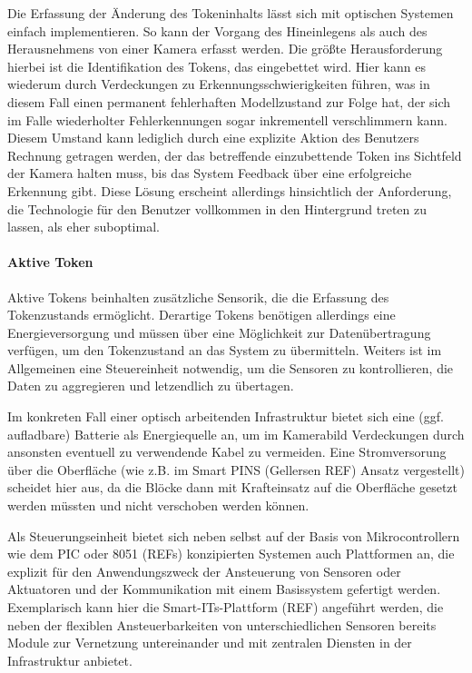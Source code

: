 Die Erfassung der Änderung des Tokeninhalts lässt sich mit optischen Systemen einfach implementieren. So kann der Vorgang des Hineinlegens als auch des Herausnehmens von einer Kamera erfasst werden. Die größte Herausforderung hierbei ist die Identifikation des Tokens, das eingebettet wird. Hier kann es wiederum durch Verdeckungen zu Erkennungsschwierigkeiten führen, was in diesem Fall einen permanent fehlerhaften Modellzustand zur Folge hat, der sich im Falle wiederholter Fehlerkennungen sogar inkrementell verschlimmern kann. Diesem Umstand kann lediglich durch eine explizite Aktion des Benutzers Rechnung getragen werden, der das betreffende einzubettende Token ins Sichtfeld der Kamera halten muss, bis das System Feedback über eine erfolgreiche Erkennung gibt. Diese Lösung erscheint allerdings hinsichtlich der Anforderung, die Technologie für den Benutzer vollkommen in den Hintergrund treten zu lassen, als eher suboptimal.


\paragraph{Aktive Token} %
\label{par:aktive_token}

Aktive Tokens beinhalten zusätzliche Sensorik, die die Erfassung des Tokenzustands ermöglicht. Derartige Tokens benötigen allerdings eine Energieversorgung und müssen über eine Möglichkeit zur Datenübertragung verfügen, um den Tokenzustand an das System zu übermitteln. Weiters ist im Allgemeinen eine Steuereinheit notwendig, um die Sensoren zu kontrollieren, die Daten zu aggregieren und letzendlich zu übertagen.

Im konkreten Fall einer optisch arbeitenden Infrastruktur bietet sich eine (ggf. aufladbare) Batterie als Energiequelle an, um im Kamerabild Verdeckungen durch ansonsten eventuell zu verwendende Kabel zu vermeiden. Eine Stromversorung über die Oberfläche (wie z.B. im Smart PINS (Gellersen REF) Ansatz vergestellt) scheidet hier aus, da die Blöcke dann mit Krafteinsatz auf die Oberfläche gesetzt werden müssten und nicht verschoben werden können. 

Als Steuerungseinheit bietet sich neben selbst auf der Basis von Mikrocontrollern wie dem PIC oder 8051 (REFs) konzipierten Systemen auch Plattformen an, die explizit für den Anwendungszweck der Ansteuerung von Sensoren oder Aktuatoren und der Kommunikation mit einem Basissystem gefertigt werden. Exemplarisch kann hier die Smart-ITs-Plattform (REF) angeführt werden, die neben der flexiblen Ansteuerbarkeiten von unterschiedlichen Sensoren bereits Module zur Vernetzung untereinander und mit zentralen Diensten in der Infrastruktur anbietet.

